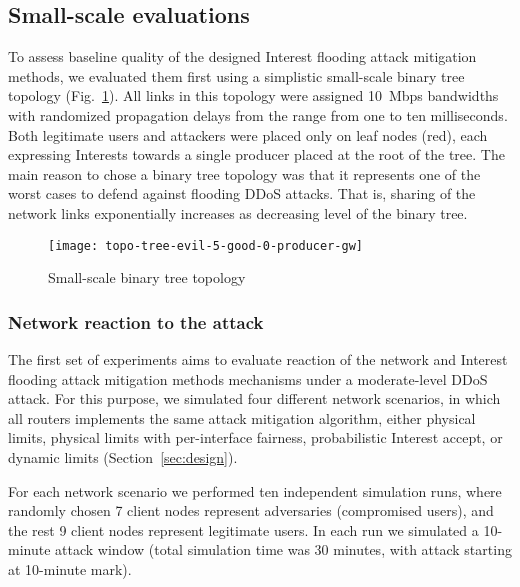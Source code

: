 \subsection{Small-scale evaluations}
\label{sec:small-scale}

To assess baseline quality of the designed Interest flooding attack mitigation methods, we evaluated them first using a simplistic small-scale binary tree topology (Fig.~\ref{fig:small-scale}).
All links in this topology were assigned 10~Mbps bandwidths with randomized propagation delays from the range from one to ten milliseconds.
Both legitimate users and attackers were placed only on leaf nodes (red), each expressing Interests towards a single producer placed at the root of the tree. 
The main reason to chose a binary tree topology was that it represents one of the worst cases to defend against flooding DDoS attacks.
That is, sharing of the network links exponentially increases as decreasing level of the binary tree.

\begin{figure}[htbp]
  \centering
  \texttt{[image: topo-tree-evil-5-good-0-producer-gw]}
  \caption{Small-scale binary tree topology}
  \label{fig:small-scale}
\end{figure}


\subsubsection{Network reaction to the attack}

The first set of experiments aims to evaluate reaction of the network and Interest flooding attack mitigation methods mechanisms under a moderate-level DDoS attack.
For this purpose, we simulated four different network scenarios, in which all routers implements the same attack mitigation algorithm, either physical limits, physical limits with per-interface fairness, probabilistic Interest accept, or dynamic limits (Section~\ref{sec:design}).

For each network scenario we performed ten independent simulation runs, where randomly chosen 7 client nodes represent adversaries (compromised users), and the rest 9 client nodes represent legitimate users.
In each run we simulated a 10-minute attack window (total simulation time was 30 minutes, with attack starting at 10-minute mark).

